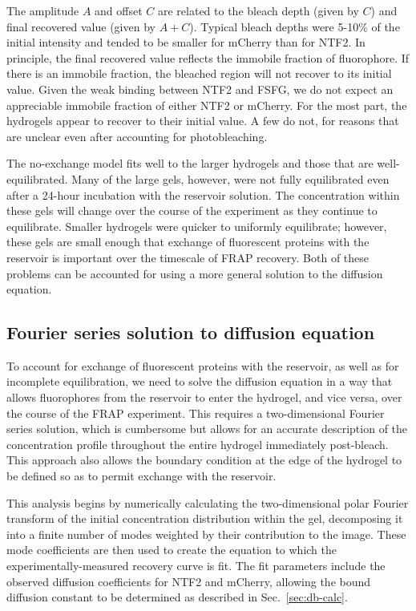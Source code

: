 The amplitude $A$ and offset $C$ are related to the bleach depth (given by $C$) and final recovered value (given by $A+C$).  Typical bleach depths were 5-10\% of the initial intensity and tended to be smaller for mCherry than for NTF2.  In principle, the final recovered value reflects the immobile fraction of fluorophore.  If there is an immobile fraction, the bleached region will not recover to its initial value.  Given the weak binding between NTF2 and FSFG, we do not expect an appreciable immobile fraction of either NTF2 or mCherry.  For the most part, the hydrogels appear to recover to their initial value.  A few do not, for reasons that are unclear even after accounting for photobleaching.

The no-exchange model fits well to the larger hydrogels and those that are well-equilibrated.  Many of the large gels, however, were not fully equilibrated even after a 24-hour incubation with the reservoir solution.  The concentration within these gels will change over the course of the experiment as they continue to equilibrate.  Smaller hydrogels were quicker to uniformly equilibrate; however, these gels are small enough that exchange of fluorescent proteins with the reservoir is important over the timescale of FRAP recovery.  Both of these problems can be accounted for using a more general solution to the diffusion equation.

\subsection{Fourier series solution to diffusion equation}

To account for exchange of fluorescent proteins with the reservoir, as well as for incomplete equilibration, we need to solve the diffusion equation in a way that allows fluorophores from the reservoir to enter the hydrogel, and vice versa, over the course of the FRAP experiment.  This requires a two-dimensional Fourier series solution, which is cumbersome but allows for an accurate description of the concentration profile throughout the entire hydrogel immediately post-bleach.  This approach also allows the boundary condition at the edge of the hydrogel to be defined so as to permit exchange with the reservoir.

This analysis begins by numerically calculating the two-dimensional polar Fourier transform of the initial concentration distribution within the gel, decomposing it into a finite number of modes weighted by their contribution to the image.  These mode coefficients are then used to create the equation to which the experimentally-measured recovery curve is fit.  The fit parameters include the observed diffusion coefficients for NTF2 and mCherry, allowing the bound diffusion constant to be determined as described in Sec.~\ref{sec:db-calc}.

